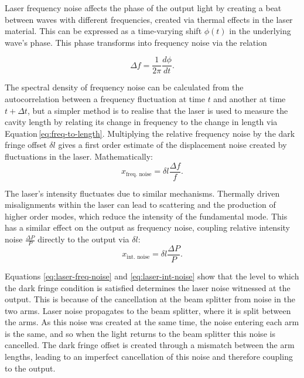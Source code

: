 Laser frequency noise affects the phase of the output light by creating a beat between waves with different frequencies, created via thermal effects in the laser material. This can be expressed as a time-varying shift $\phi \left( t \right)$ in the underlying wave's phase. This phase transforms into frequency noise via the relation

\begin{equation}
  \Delta f = \frac{1}{2 \pi} \frac{d \phi}{dt}.
\end{equation}

The spectral density of frequency noise can be calculated from the autocorrelation between a frequency fluctuation at time $t$ and another at time $t + \Delta t$, but a simpler method is to realise that the laser is used to measure the cavity length by relating its change in frequency to the change in length via Equation\,\ref{eq:freq-to-length}. Multiplying the relative frequency noise by the dark fringe offset $\delta l$ gives a first order estimate of the displacement noise created by fluctuations in the laser. Mathematically:
\begin{equation}
  \label{eq:laser-freq-noise}
  x_{\text{freq. noise}} = \delta l \frac{\Delta f}{f}.
\end{equation}

The laser's intensity fluctuates due to similar mechanisms. Thermally driven misalignments within the laser can lead to scattering and the production of higher order modes, which reduce the intensity of the fundamental mode. This has a similar effect on the output as frequency noise, coupling relative intensity noise $\frac{\Delta P}{P}$ directly to the output via $\delta l$:
\begin{equation}
  \label{eq:laser-int-noise}
  x_{\text{int. noise}} = \delta l \frac{\Delta P}{P}.
\end{equation}

Equations \ref{eq:laser-freq-noise} and \ref{eq:laser-int-noise} show that the level to which the dark fringe condition is satisfied determines the laser noise witnessed at the output. This is because of the cancellation at the beam splitter from noise in the two arms. Laser noise propagates to the beam splitter, where it is split between the arms. As this noise was created at the same time, the noise entering each arm is the same, and so when the light returns to the beam splitter this noise is cancelled. The dark fringe offset is created through a mismatch between the arm lengths, leading to an imperfect cancellation of this noise and therefore coupling to the output.

